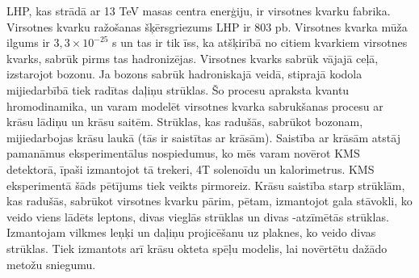 LHP, kas strādā ar 13 TeV masas centra enerģiju, ir virsotnes kvarku fabrika. Virsotnes kvarku ražošanas šķērsgriezums LHP ir 803 pb. Virsotnes kvarka mūža ilgums ir $3,3\times10^{-25}$ s un tas ir tik īss, ka atšķirībā no citiem kvarkiem virsotnes kvarks, sabrūk pirms tas hadronizējas. Virsotnes kvarks sabrūk vājajā ceļā, izstarojot \PW bozonu. Ja \PW bozons sabrūk hadroniskajā veidā, stiprajā kodola mijiedarbībā tiek radītas daļiņu strūklas. Šo procesu apraksta kvantu hromodinamika, un varam modelēt virsotnes kvarka sabrukšanas procesu ar krāsu lādiņu un krāsu saitēm. Strūklas, kas radušās, sabrūkot \PW bozonam, mijiedarbojas krāsu laukā (tās ir saistītas ar krāsām). Saistība ar krāsām atstāj pamanāmus eksperimentālus nospiedumus, ko mēs varam novērot KMS detektorā, īpaši izmantojot tā trekeri, 4T solenoīdu un kalorimetrus. KMS eksperimentā šāds pētījums tiek veikts pirmoreiz. Krāsu saistība starp strūklām, kas radušās, sabrūkot virsotnes kvarku pārim, pētam, izmantojot gala stāvokli, ko veido viens lādēts leptons, divas vieglās strūklas un divas \cPqb-atzīmētās strūklas. Izmantojam vilkmes leņķi un daļiņu projicēšanu uz plaknes, ko veido divas strūklas. Tiek izmantots arī krāsu okteta \PW spēļu modelis, lai novērtētu dažādo metožu sniegumu.
